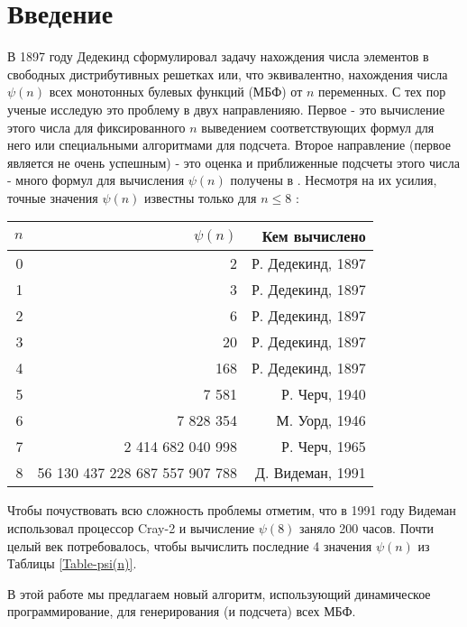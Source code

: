 \newpage
\chapter{Введение}
 В 1897 году Дедекинд сформулировал задачу нахождения числа элементов в
 свободных дистрибутивных решетках или, что эквивалентно,
 нахождения числа $\psi(n)$ всех монотонных булевых функций (МБФ) 
 от $n$ переменных. С тех пор ученые исследую это проблему в двух
 направленияю.
 Первое - это вычисление этого числа для фиксированного $n$
 выведением соответствующих формул для него или специальными
 алгоритмами для подсчета.
 Второе направление (первое является не очень успешным) - это 
 оценка и приближенные подсчеты этого числа - много формул для
 вычисления $\psi(n)$ получены в \cite{Kisielewicz, Kleitman, Korshunov81, Korshunov02}.
 Несмотря на их усилия, точные значения $\psi(n)$ известны
 только для $n \leq 8$ \cite{Fidytek, Tombak, Wiedemann}: \\
\begin{center}
 \begin{tabular}{ r | r | r } 
  $n$ & $\psi(n)$ & Кем вычислено \\
  \hline
  0 & 	2				& \T Р. Дедекинд, 1897 \\
  1 & 	3 				& Р. Дедекинд, 1897 \\
  2 & 	6 				& Р. Дедекинд, 1897 \\
  3 & 	20 				& Р. Дедекинд, 1897 \\
  4 & 	168 				& Р. Дедекинд, 1897 \\
  5 & 	7 581 				& Р. Черч, 1940 \\
  6 &	7 828 354			& М. Уорд, 1946 \\
  7 &	2 414 682 040 998 		& Р. Черч, 1965 \\
  8 &	56 130 437 228 687 557 907 788 	& \B Д. Видеман, 1991 \\
  \hline
  \end{tabular}
\end{center}

Чтобы почуствовать всю сложность проблемы отметим, что в 1991 году
Видеман использовал процессор Cray-2 и вычисление $\psi(8)$
заняло 200 часов. Почти целый век потребовалось, чтобы вычислить
последние 4 значения $\psi(n)$ из Таблицы \ref{Table-psi(n)}.\par
В этой работе мы предлагаем новый алгоритм, использующий 
динамическое программирование,
для генерирования (и подсчета) всех МБФ.
